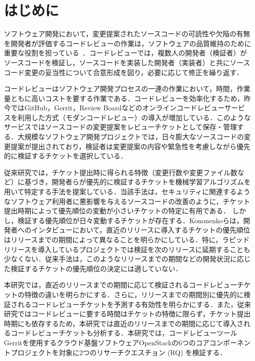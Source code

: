 \documentclass[T,J]{fose} %
\begin{document}
\section{はじめに}

ソフトウェア開発において，変更提案されたソースコードの可読性や欠陥の有無を開発者が評価するコードレビューの作業は，ソフトウェアの品質維持のために重要な役割を担っている~\cite{quality1}\cite{quality2}．コードレビューでは，複数人の開発者（検証者）がソースコードを検証し，ソースコードを実装した開発者（実装者）と共にソースコード変更の妥当性について合意形成を図り，必要に応じて修正を繰り返す．

コードレビューはソフトウェア開発プロセスの一連の作業において，時間，作業量ともに高いコストを要する作業である\cite{cost}．コードレビューを効率化するため，昨今ではGitHub，Gerrit，Review Boardなどのオンラインコードレビューサービスを利用した方式（モダンコードレビュー\cite{quality1}）の導入が増加している．このようなサービスではソースコードの変更提案をレビューチケットとして保存・管理する．大規模なソフトウェア開発プロジェクトでは，日々膨大なソースコードの変更提案が提出されており，検証者は変更提案の内容や緊急性を考慮しながら優先的に検証するチケットを選択している\cite{integrator}．

従来研究では，チケット提出時に得られる特徴（変更行数や変更ファイル数など）に基づき，開発者らが優先的に検証するチケットを機械学習アルゴリズムを用いて特定する手法を提案している\cite{prioritizer}\cite{review_prioritize_pineapple}．当該手法は，セキュリティに関連するようなソフトウェア利用者に悪影響を与えるソースコードの改善のように，チケット提出時期によって優先順位の変動が小さいチケットの特定に有用である．
しかし，検証する優先順位が日々変動するチケットが存在する．Kononenkoらは，開発者へのインタビューにおいて，直近のリリースに導入するチケットの優先順位はリリースまでの期間によって異なることを明らかにしている\cite{release_merge}．特に，ラピッドリリースを導入しているプロジェクトでは検証を次のリリースに延期することも少なくない．従来手法は，このようなリリースまでの期間などの開発状況に応じた検証するチケットの優先順位の決定には適していない．

本研究では，直近のリリースまでの期間に応じて検証されるコードレビューチケットの特徴の違いを明らかにする．さらに，リリースまでの期間別に優先的に検証されるコードレビューチケットを予測する有効性を明らかにする．また，従来研究\cite{estimate_merge_time}ではコードレビューに要する時間はチケットの特徴に限らず，チケット提出時期にも依存するため，本研究では直近のリリースまでの期間に応じて導入されるコードレビューチケットも分析する．本研究では，コードレビューツールGerritを使用するクラウド基盤ソフトウェアOpenStackの6つのコアコンポーネントプロジェクトを対象に2つのリサーチクエスチョン (RQ) を検証する．
\end{document}
